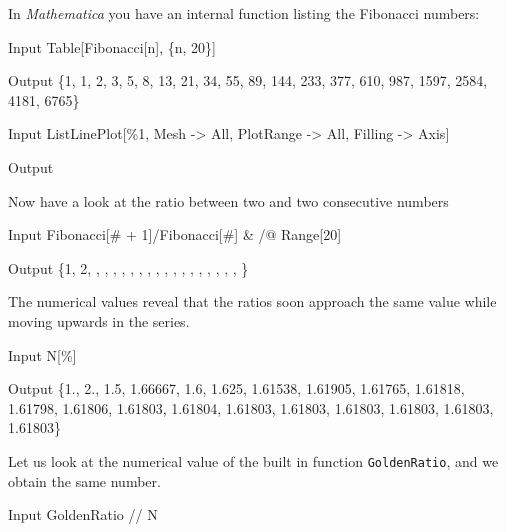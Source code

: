\documentclass[11pt,fleqn]{book} %
\begin{document}
\begin{theorem}
\hfill \break
In \textit{Mathematica} you have an internal function listing the Fibonacci numbers:
\begin{mmaCell}[index=1]{Input}
  Table[Fibonacci[n], \{n, 20\}]
\end{mmaCell}
\begin{mmaCell}{Output}
  \{1, 1, 2, 3, 5, 8, 13, 21, 34, 55, 89, 144, 233, 377, 
  610, 987, 1597, 2584, 4181, 6765\}
\end{mmaCell}
\begin{mmaCell}{Input}
  ListLinePlot[\%1, Mesh -> All, PlotRange -> All, Filling -> Axis]
\end{mmaCell}
\begin{mmaCell}[moregraphics={moreig={scale=.7}}]{Output}
\end{mmaCell}
Now have a look at the ratio between two and two consecutive numbers
\begin{mmaCell}{Input}
  Fibonacci[# + 1]/Fibonacci[#] & /@ Range[20]
\end{mmaCell}
\begin{mmaCell}{Output}
  \Big\{1, 2, , , , , , , , , , , , ,
  \hfill \break
  , , , , , \Big\} 
\end{mmaCell}
The numerical values reveal that the ratios soon approach the same value while moving upwards in the series.
\begin{mmaCell}{Input}
  N[\%]
\end{mmaCell}
\begin{mmaCell}{Output}
  \{1., 2., 1.5, 1.66667, 1.6, 1.625, 1.61538, 1.61905, 1.61765, 
  1.61818, 1.61798, 1.61806, 1.61803, 1.61804, 1.61803, 1.61803, 
  1.61803, 1.61803, 1.61803, 1.61803\} 
\end{mmaCell}
Let us look at the numerical value of the built in function \texttt{GoldenRatio}, and we obtain the same number.
\begin{mmaCell}{Input}
  GoldenRatio // N
\end{mmaCell}

\end{theorem}
\end{document}
